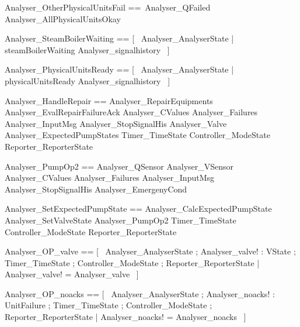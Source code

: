 \documentclass{article}
\begin{document}
\begin{zed}
	Analyser\_OtherPhysicalUnitsFail ==~\lnot Analyser\_QFailed \land \lnot Analyser\_AllPhysicalUnitsOkay
\end{zed}

\begin{zed}
	Analyser\_SteamBoilerWaiting == [~  Analyser\_AnalyserState | steamBoilerWaiting \in Analyser\_signalhistory  ~]
\end{zed}

\begin{zed}
	Analyser\_PhysicalUnitsReady == [~  Analyser\_AnalyserState | physicalUnitsReady \in Analyser\_signalhistory  ~]
\end{zed}

\begin{zed}
	Analyser\_HandleRepair == Analyser\_RepairEquipments \land Analyser\_EvalRepairFailureAck \land \Xi Analyser\_CValues \land \Xi Analyser\_Failures \land \Xi Analyser\_InputMsg \land \Xi Analyser\_StopSignalHis \land \Xi Analyser\_Valve \land \Xi Analyser\_ExpectedPumpStates \land \Xi Timer\_TimeState \land \Xi Controller\_ModeState \land \Xi Reporter\_ReporterState
\end{zed}

\begin{zed}
	Analyser\_PumpOp2 == \Xi Analyser\_QSensor \land \Xi Analyser\_VSensor \land \Xi Analyser\_CValues \land \Xi Analyser\_Failures \land \Xi Analyser\_InputMsg \land \Xi Analyser\_StopSignalHis \land \Xi Analyser\_EmergenyCond
\end{zed}

\begin{zed}
	Analyser\_SetExpectedPumpState == Analyser\_CalcExpectedPumpState \land Analyser\_SetValveState \land Analyser\_PumpOp2 \land \Xi Timer\_TimeState \land \Xi Controller\_ModeState \land \Xi Reporter\_ReporterState
\end{zed}

\begin{zed}
	Analyser\_OP\_valve == [~  \Xi Analyser\_AnalyserState ; Analyser\_valve! : VState ; \Xi Timer\_TimeState ; \Xi Controller\_ModeState ; \Xi Reporter\_ReporterState | Analyser\_valve! = Analyser\_valve  ~]
\end{zed}

\begin{zed}
	Analyser\_OP\_noacks == [~  \Xi Analyser\_AnalyserState ; Analyser\_noacks! : \power UnitFailure ; \Xi Timer\_TimeState ; \Xi Controller\_ModeState ; \Xi Reporter\_ReporterState | Analyser\_noacks! = Analyser\_noacks  ~]
\end{zed}
\end{document}
